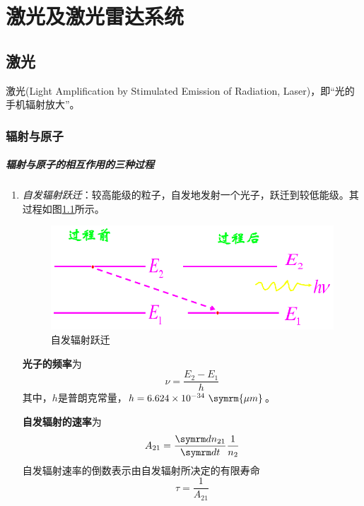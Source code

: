 \chapter{激光及激光雷达系统}

\section{激光} %
激光(Light Amplification by Stimulated Emission of Radiation, Laser)，即“光的手机辐射放大”。

\subsection{辐射与原子} %
\paragraph{辐射与原子的相互作用的三种过程} \begin{enumerate}
	\item 
		\textit{自发辐射跃迁}：较高能级的粒子，自发地发射一个光子，跃迁到较低能级。其过程如图\ref{fig:自发辐射跃迁}所示。
		\begin{figure}[htbp]
			\centering
			\includegraphics[width=0.7\linewidth]{figure/Chapter2/自发辐射跃迁}
			\caption{自发辐射跃迁}
			\label{fig:自发辐射跃迁}
		\end{figure}
		
		\textbf{光子的频率}为\begin{equation} \nu = \dfrac{E_2-E_1}{h} \end{equation}其中，$ h $是普朗克常量，$ h=6.624 \times 10^{-34} \ \symrm{\mu m} $。
		
		\textbf{自发辐射的速率}为\begin{equation} A_{21} = \dfrac{\diff n_{21}}{\diff t} \dfrac{1}{n_2} \end{equation}
		自发辐射速率的倒数表示由自发辐射所决定的有限寿命\begin{equation} \tau = \dfrac{1}{A_{21}} \end{equation}
		

\end{enumerate}
